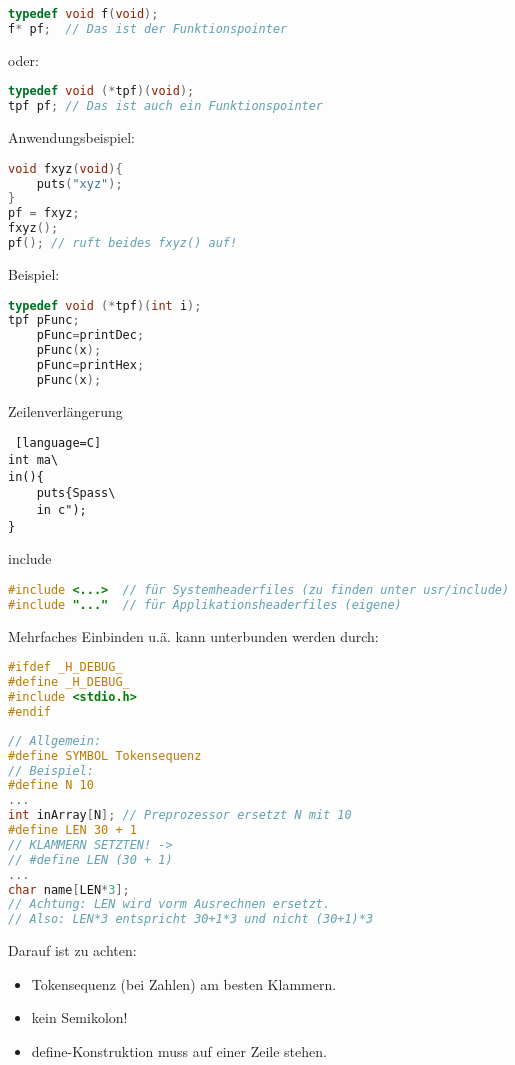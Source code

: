 \begin{multicols*}{3}
\HRule[4pt]
\begin{lstlisting}[language=C]
typedef void f(void);
f* pf;	// Das ist der Funktionspointer
\end{lstlisting}
oder:
\begin{lstlisting}[language=C]
typedef void (*tpf)(void);
tpf pf;	// Das ist auch ein Funktionspointer
\end{lstlisting}
Anwendungsbeispiel:
\begin{lstlisting}[language=C]
void fxyz(void){
	puts("xyz");
}
pf = fxyz;
fxyz();
pf(); // ruft beides fxyz() auf!
\end{lstlisting}
Beispiel:
\begin{lstlisting}[language=C]
typedef void (*tpf)(int i);
tpf pFunc;
	pFunc=printDec;
	pFunc(x);
	pFunc=printHex;
	pFunc(x);
\end{lstlisting}
\HRule[4pt]
Zeilenverlängerung
\begin{lstlisting} [language=C]
int ma\
in(){
	puts{Spass\
	in c");
}
\end{lstlisting}

include

\begin{lstlisting}[language=C]
#include <...>	// für Systemheaderfiles (zu finden unter usr/include)
#include "..."	// für Applikationsheaderfiles (eigene)
\end{lstlisting}
Mehrfaches Einbinden u.ä. kann unterbunden werden durch:
\begin{lstlisting}[language=C]
#ifdef _H_DEBUG_
#define _H_DEBUG_
#include <stdio.h>
#endif
\end{lstlisting}


\begin{lstlisting}[language = C]
// Allgemein:
#define SYMBOL Tokensequenz
// Beispiel:
#define N 10
...
int inArray[N];	// Preprozessor ersetzt N mit 10
#define LEN 30 + 1
// KLAMMERN SETZTEN! ->
// #define LEN (30 + 1)
...
char name[LEN*3];	
// Achtung: LEN wird vorm Ausrechnen ersetzt. 
// Also: LEN*3 entspricht 30+1*3 und nicht (30+1)*3
\end{lstlisting}

Darauf ist zu achten:
\begin{itemize}
\item Tokensequenz (bei Zahlen) am besten Klammern.
\item kein Semikolon!
\item define-Konstruktion muss auf einer Zeile stehen.
\end{itemize}


\end{multicols*}
